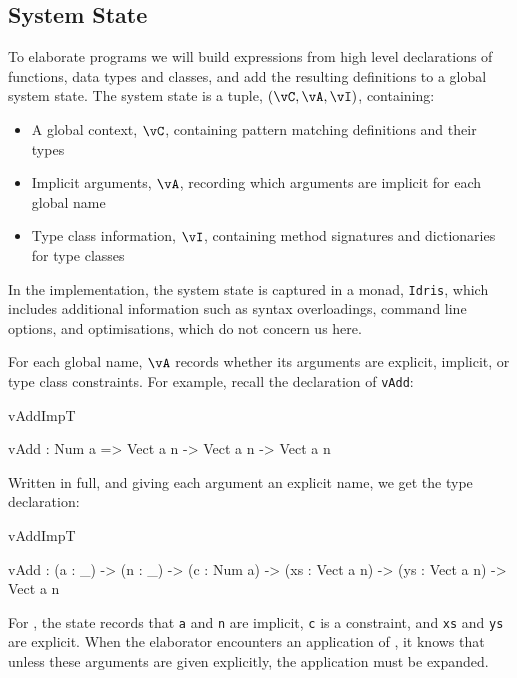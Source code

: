 


\subsection{System State}

\label{sect:sysstate}

To elaborate \Idris{} programs we will build expressions from high level
declarations of functions, data types and classes, and add the resulting
definitions to a global system state.
The system state is a tuple, $(\vC,\vA,\vI)$, containing:

\begin{itemize}
\item A global context, $\vC$, containing pattern matching definitions and their types
\item Implicit arguments, $\vA$, recording which arguments are implicit for each global name
\item Type class information, $\vI$, containing method signatures and dictionaries for type classes
\end{itemize}

In the implementation, the system state is captured in a monad, \texttt{Idris},
which includes additional information such as syntax overloadings, command line
options, and optimisations, which do not concern us here. 

For each global name, $\vA$ records whether its arguments are explicit, implicit,
or type class constraints.  For example, recall the declaration
of \texttt{vAdd}:

\begin{SaveVerbatim}{vAddImpT}

vAdd : Num a => Vect a n -> Vect a n -> Vect a n

\end{SaveVerbatim}

\noindent
Written in full, and giving each argument an explicit name, we get the
type declaration:

\begin{SaveVerbatim}{vAddImpT}

vAdd : (a : _) -> (n : _) -> (c : Num a) -> 
       (xs : Vect a n) -> (ys : Vect a n) -> Vect a n

\end{SaveVerbatim}

\noindent
For , the state records that \texttt{a} and \texttt{n} are implicit, 
\texttt{c} is a constraint, and \texttt{xs} and \texttt{ys} are explicit. When
the elaborator encounters an application of , it knows that unless these arguments
are given explicitly, the application must be expanded.


